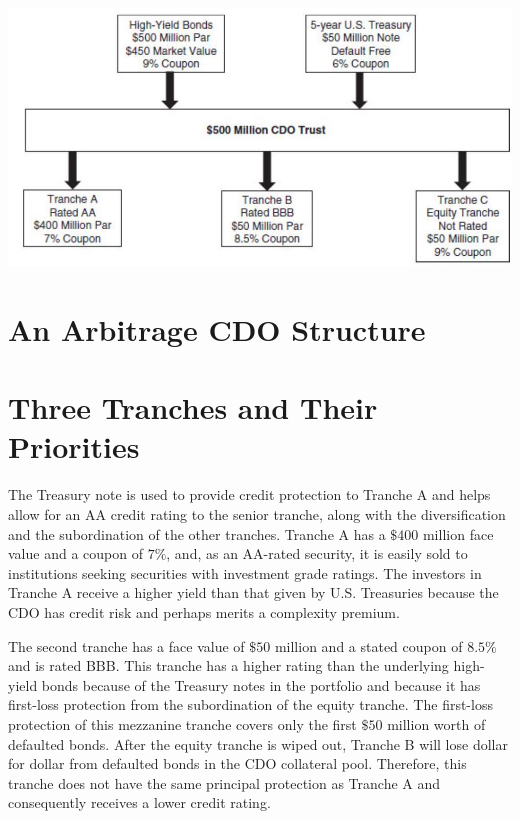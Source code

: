 \documentclass[11pt]{article}
\begin{document}
\begin{center}
\includegraphics[max width=\textwidth]{2024_04_10_bea18d3cfa917e559286g-2}
\end{center}

\section*{An Arbitrage CDO Structure}
\section*{Three Tranches and Their Priorities}
The Treasury note is used to provide credit protection to Tranche A and helps allow for an AA credit rating to the senior tranche, along with the diversification and the subordination of the other tranches. Tranche A has a $\$ 400$ million face value and a coupon of $7 \%$, and, as an AA-rated security, it is easily sold to institutions seeking securities with investment grade ratings. The investors in Tranche A receive a higher yield than that given by U.S. Treasuries because the CDO has credit risk and perhaps merits a complexity premium.

The second tranche has a face value of $\$ 50$ million and a stated coupon of $8.5 \%$ and is rated BBB. This tranche has a higher rating than the underlying high-yield bonds because of the Treasury notes in the portfolio and because it has first-loss protection from the subordination of the equity tranche. The first-loss protection of this mezzanine tranche covers only the first $\$ 50$ million worth of defaulted bonds. After the equity tranche is wiped out, Tranche B will lose dollar for dollar from defaulted bonds in the CDO collateral pool. Therefore, this tranche does not have the same principal protection as Tranche A and consequently receives a lower credit rating.
\end{document}
